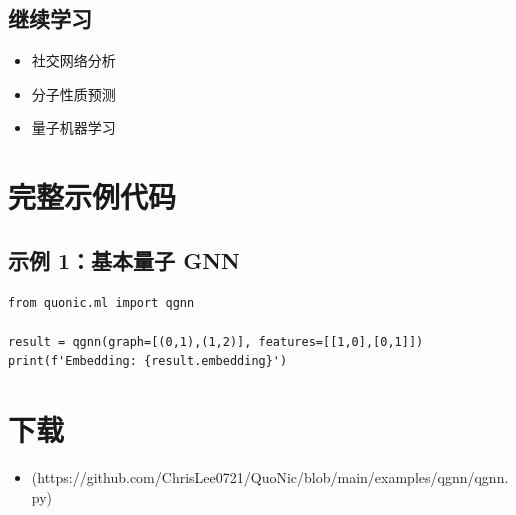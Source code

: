 \documentclass[12pt,a4paper]{article}
\begin{document}
\subsection{继续学习}
\begin{itemize}
  \item 社交网络分析
  \item 分子性质预测
  \item 量子机器学习
\end{itemize}

\section{完整示例代码}

\subsection{示例 1：基本量子 GNN}

\begin{verbatim}
from quonic.ml import qgnn

result = qgnn(graph=[(0,1),(1,2)], features=[[1,0],[0,1]])
print(f'Embedding: {result.embedding}')
\end{verbatim}

\section{下载}

\begin{itemize}
  \item [qgnn.py](https://github.com/ChrisLee0721/QuoNic/blob/main/examples/qgnn/qgnn.py)
\end{itemize}
\end{document}
